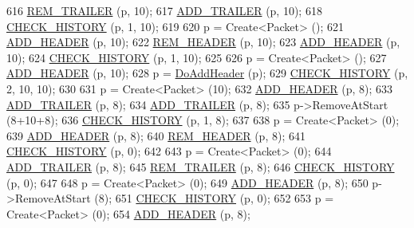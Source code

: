 \begin{DoxyCode}
616   \hyperlink{packet-metadata-test_8cc_a1e12d07d4d7c9ab1695230cdf925b4d6}{REM\_TRAILER} (p, 10);
617   \hyperlink{packet-metadata-test_8cc_ab10bc130bb7184d47509ea44f4fb24df}{ADD\_TRAILER} (p, 10);
618   \hyperlink{packet-metadata-test_8cc_a15a730e778d9d498a39e778bcd39684c}{CHECK\_HISTORY} (p, 1, 10);
619 
620   p = Create<Packet> ();
621   \hyperlink{packet-metadata-test_8cc_a120012d48d29d678b3138d5c7b9bf714}{ADD\_HEADER} (p, 10);
622   \hyperlink{packet-metadata-test_8cc_a8694c61c9ba33c72896dde3628538a84}{REM\_HEADER} (p, 10);
623   \hyperlink{packet-metadata-test_8cc_a120012d48d29d678b3138d5c7b9bf714}{ADD\_HEADER} (p, 10);
624   \hyperlink{packet-metadata-test_8cc_a15a730e778d9d498a39e778bcd39684c}{CHECK\_HISTORY} (p, 1, 10);
625 
626   p = Create<Packet> ();
627   \hyperlink{packet-metadata-test_8cc_a120012d48d29d678b3138d5c7b9bf714}{ADD\_HEADER} (p, 10);
628   p = \hyperlink{classPacketMetadataTest_a311c0830c6c28e6430961fc5d5a05cc8}{DoAddHeader} (p);
629   \hyperlink{packet-metadata-test_8cc_a15a730e778d9d498a39e778bcd39684c}{CHECK\_HISTORY} (p, 2, 10, 10);
630 
631   p = Create<Packet> (10);
632   \hyperlink{packet-metadata-test_8cc_a120012d48d29d678b3138d5c7b9bf714}{ADD\_HEADER} (p, 8);
633   \hyperlink{packet-metadata-test_8cc_ab10bc130bb7184d47509ea44f4fb24df}{ADD\_TRAILER} (p, 8);
634   \hyperlink{packet-metadata-test_8cc_ab10bc130bb7184d47509ea44f4fb24df}{ADD\_TRAILER} (p, 8);
635   p->RemoveAtStart (8+10+8);
636   \hyperlink{packet-metadata-test_8cc_a15a730e778d9d498a39e778bcd39684c}{CHECK\_HISTORY} (p, 1, 8);
637 
638   p = Create<Packet> (0);
639   \hyperlink{packet-metadata-test_8cc_a120012d48d29d678b3138d5c7b9bf714}{ADD\_HEADER} (p, 8);
640   \hyperlink{packet-metadata-test_8cc_a8694c61c9ba33c72896dde3628538a84}{REM\_HEADER} (p, 8);
641   \hyperlink{packet-metadata-test_8cc_a15a730e778d9d498a39e778bcd39684c}{CHECK\_HISTORY} (p, 0);
642 
643   p = Create<Packet> (0);
644   \hyperlink{packet-metadata-test_8cc_ab10bc130bb7184d47509ea44f4fb24df}{ADD\_TRAILER} (p, 8);
645   \hyperlink{packet-metadata-test_8cc_a1e12d07d4d7c9ab1695230cdf925b4d6}{REM\_TRAILER} (p, 8);
646   \hyperlink{packet-metadata-test_8cc_a15a730e778d9d498a39e778bcd39684c}{CHECK\_HISTORY} (p, 0);
647 
648   p = Create<Packet> (0);
649   \hyperlink{packet-metadata-test_8cc_a120012d48d29d678b3138d5c7b9bf714}{ADD\_HEADER} (p, 8);
650   p->RemoveAtStart (8);
651   \hyperlink{packet-metadata-test_8cc_a15a730e778d9d498a39e778bcd39684c}{CHECK\_HISTORY} (p, 0);
652 
653   p = Create<Packet> (0);
654   \hyperlink{packet-metadata-test_8cc_a120012d48d29d678b3138d5c7b9bf714}{ADD\_HEADER} (p, 8);

\end{DoxyCode}

